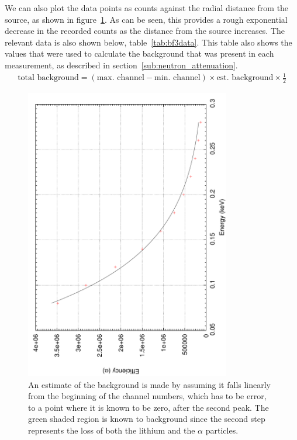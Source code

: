 We can also plot the data points as counts against the radial distance from the source, as shown in figure~\ref{fig:bf3countsvsradius}. As can be seen, this provides a rough exponential decrease in the recorded counts as the distance from the source increases. The relevant data is also shown below, table~\ref{tab:bf3data}. This table also shows the values that were used to calculate the background that was present in each measurement, as described in section~\ref{sub:neutron_attenuation}.
\begin{align}
  \text{total background} = (\text{max. channel} - \text{min. channel}) \times \text{est. background} \times \frac{1}{2}
\end{align}
\begin{figure}[ht]
  \centering
  \includegraphics[angle=270,width=0.8\textwidth]{BF3countsvsradius.pdf}
  \caption{An estimate of the background is made by assuming it falls linearly from the beginning of the channel numbers, which has to be error, to a point where it is known to be zero, after the second peak. The green shaded region is known to background since the second step represents the loss of both the lithium and the $\alpha$ particles. \label{fig:bf3countsvsradius}}
\end{figure}
